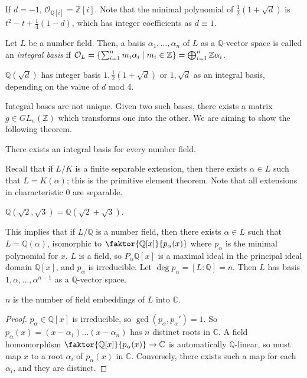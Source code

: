 \begin{example}
    If \( d = -1 \), \( \mathcal O_{\mathbb Q[i]} = \mathbb Z[i] \).
    Note that the minimal polynomial of \( \frac{1}{2}(1+\sqrt d) \) is \( t^2 - t + \frac{1}{4}(1-d) \), which has integer coefficients as \( d \equiv 1 \).
\end{example}
\begin{definition}
    Let \( L \) be a number field.
    Then, a basis \( \alpha_1, \dots, \alpha_n \) of \( L \) as a \( \mathbb Q \)-vector space is called an \emph{integral basis} if \( \mathcal O_L = \qty{\sum_{i=1}^n m_i \alpha_i \mid m_i \in \mathbb Z} = \bigoplus_{i=1}^n \mathbb Z \alpha_i \).
\end{definition}
\begin{example}
    \( \mathbb Q(\sqrt d) \) has integer basis \( 1, \frac{1}{2}(1+\sqrt d) \) or \( 1, \sqrt d \) as an integral basis, depending on the value of \( d \) mod 4.
\end{example}
Integral bases are not unique.
Given two such bases, there exists a matrix \( g \in GL_n(\mathbb Z) \) which transforms one into the other.
We are aiming to show the following theorem.
\begin{theorem}
    There exists an integral basis for every number field.
\end{theorem}
Recall that if \( L / K \) is a finite separable extension, then there exists \( \alpha \in L \) such that \( L = K(\alpha) \); this is the primitive element theorem.
Note that all extensions in characteristic 0 are separable.
\begin{example}
    \( \mathbb Q(\sqrt 2, \sqrt 3) = \mathbb Q(\sqrt 2 + \sqrt 3) \).
\end{example}
This implies that if \( L / \mathbb Q \) is a number field, then there exists \( \alpha \in L \) such that \( L = \mathbb Q(\alpha) \), isomorphic to \( \faktor{\mathbb Q[x]}{p_\alpha(x)} \) where \( p_\alpha \) is the minimal polynomial for \( x \).
\( L \) is a field, so \( P_\alpha \mathbb Q[x] \) is a maximal ideal in the principal ideal domain \( \mathbb Q[x] \), and \( p_\alpha \) is irreducible.
Let \( \deg p_\alpha = [L:\mathbb Q] = n \).
Then \( L \) has basis \( 1, \alpha, \dots, \alpha^{n-1} \) as a \( \mathbb Q \)-vector space.
\begin{lemma}
    \( n \) is the number of field embeddings of \( L \) into \( \mathbb C \).
\end{lemma}
\begin{proof}
    \( p_\alpha \in \mathbb Q[x] \) is irreducible, so \( \gcd(p_\alpha, p_\alpha') = 1 \).
    So \( p_\alpha(x) = (x-\alpha_1)\dots(x-\alpha_n) \) has \( n \) distinct roots in \( \mathbb C \).
    A field homomorphism \( \faktor{\mathbb Q[x]}{p_\alpha(x)} \to \mathbb C \) is automatically \( \mathbb Q \)-linear, so must map \( x \) to a root \( \alpha_i \) of \( p_\alpha(x) \) in \( \mathbb C \).
    Conversely, there exists such a map for each \( \alpha_i \), and they are distinct.
\end{proof}
